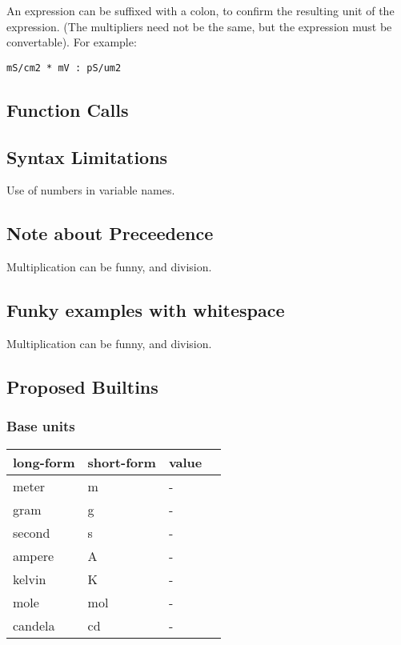 \documentclass{article}
\begin{document}
An expression can be suffixed with a colon, to confirm the resulting unit of the expression. (The multipliers need not be the same, but the expression must be convertable). For example:
\begin{verbatim}
mS/cm2 * mV : pS/um2 
\end{verbatim}


\subsection{Function Calls}



\subsection{Syntax Limitations}
Use of numbers in variable names.

\subsection*{Note about Preceedence}
Multiplication can be funny, and division.

\subsection*{Funky examples with whitespace}
Multiplication can be funny, and division.


\newpage
\subsection{Proposed Builtins}




\subsubsection{Base units}

\begin{center}
    \begin{tabular}{ | l | l |  l | p{5cm} |}
    \hline
    long-form & short-form & value  \\ \hline
    meter & m & - \\ \hline
    gram & g & - \\ \hline
    second & s & - \\ \hline
    ampere & A & - \\ \hline
    kelvin & K & - \\ \hline
    mole & mol & - \\ \hline
    candela & cd & - \\ \hline
    \end{tabular}
\end{center}
\end{document}
